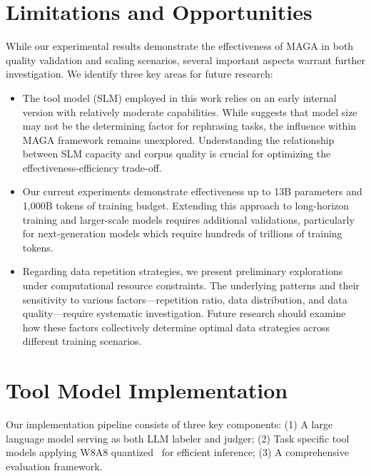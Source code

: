 \clearpage
\appendix
\section{Limitations and Opportunities}
While our experimental results demonstrate the effectiveness of MAGA in both quality validation and scaling scenarios, several important aspects warrant further investigation. We identify three key areas for future research:
\begin{itemize}[leftmargin=1.5em]
    \item The tool model (SLM) employed in this work relies on an early internal version with relatively moderate capabilities. While \citet{pieler2024rephrasing} suggests that model size may not be the determining factor for rephrasing tasks, the influence within MAGA framework remains unexplored. Understanding the relationship between SLM capacity and corpus quality is crucial for optimizing the effectiveness-efficiency trade-off.
    
    \item Our current experiments demonstrate effectiveness up to 13B parameters and 1,000B tokens of training budget. Extending this approach to long-horizon training and larger-scale models requires additional validations, particularly for next-generation models which require hundreds of trillions of training tokens.
    
    \item Regarding data repetition strategies, we present preliminary explorations under computational resource constraints. The underlying patterns and their sensitivity to various factors—repetition ratio, data distribution, and data quality—require systematic investigation. Future research should examine how these factors collectively determine optimal data strategies across different training scenarios.
\end{itemize}


\section{Tool Model Implementation}
\label{sec:appd_implementation_details}
Our implementation pipeline consists of three key components:
(1) A large language model serving as both LLM labeler and judger;
(2) Task specific tool models applying W8A8 quantized~\citep{xiao2023smoothquant} for efficient inference;
(3) A comprehensive evaluation framework.


